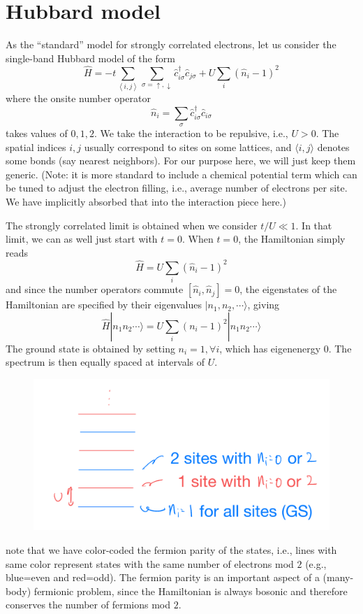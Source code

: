 \section{Hubbard model}

As the ``standard'' model for strongly correlated electrons, let us consider the single-band Hubbard model of the form
\[ \hat{H}=-t\sum_{\left< i,j \right>}{\sum_{\sigma =\uparrow ,\downarrow}{\hat{c}_{i\sigma}^{\dagger}\hat{c}_{j\sigma}}}+U\sum_i{\left( \hat{n}_i-1 \right) ^2}\]
where the onsite number operator
\[ \hat{n}_i=\sum_{\sigma}{\hat{c}_{i\sigma}^{\dagger}\hat{c}_{i\sigma}}\]
takes values of $0,1,2$. We take the interaction to be repulsive, i.e., $U>0$. The spatial indices $i,j$ usually correspond to sites on some lattices, and $\langle i,j\rangle$ denotes some bonds (say nearest neighbors). For our purpose here, we will just keep them generic. (Note: it is more standard to include a chemical potential term which can be tuned to adjust the electron filling, i.e., average number of electrons per site. We have implicitly absorbed that into the interaction piece here.)

The strongly correlated limit is obtained when we consider $t/U\ll 1$. In that limit, we can as well just start with $t=0$. When $t=0$, the Hamiltonian simply reads
\[ \hat{H}=U\sum_i{\left( \hat{n}_i-1 \right) ^2}\]
and since the number operators commute $\left[ \hat{n}_i,\hat{n}_j \right] =0$, the eigenstates of the Hamiltonian are specified by their eigenvalues $|n_1,n_2,\cdots\rangle$, giving
\[ \hat{H}|n_1n_2\cdots \rangle =U\sum_i{\left( n_i-1 \right) ^2}|n_1n_2\cdots \rangle \]
The ground state is obtained by setting $n_i=1,\forall i$, which has eigenenergy $0$. The spectrum is then equally spaced at intervals of $U$.
\begin{figure}[H]
    \centering
    \includegraphics[width=\textwidth]{jupyterbook/data/fig/lec25-fig02.png}
\end{figure}
note that we have color-coded the fermion parity of the states, i.e., lines with same color represent states with the same number of electrons mod $2$ (e.g., blue=even and red=odd). The fermion parity is an important aspect of a (many-body) fermionic problem, since the Hamiltonian is always bosonic and therefore conserves the number of fermions mod $2$.

